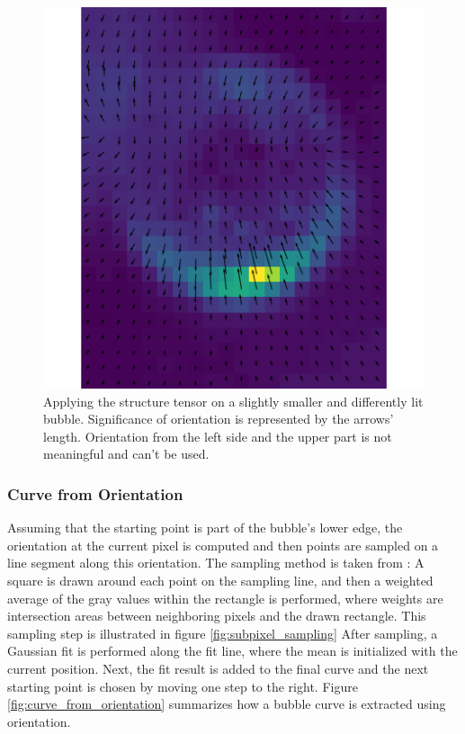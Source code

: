 					
			\begin{figure}
				\includegraphics[scale=0.5]{images/struct_tensor_result_2.png}
				\caption{Applying the structure tensor on a slightly smaller and differently lit bubble. Significance of orientation is represented by the arrows' length. Orientation from the left side and the upper part is not meaningful and can't be used.}
				\label{fig:struct_tensor_result_2}
			\end{figure}
	
	
	
	
	
	
	
			\subsubsection{Curve from Orientation}
				Assuming that the starting point is part of the bubble's lower edge, the orientation at the current pixel is computed and then points are sampled on a line segment along this orientation. The sampling method is taken from \citet{Bopp2018}: A square is drawn around each point on the sampling line, and then a weighted average of the gray values within the rectangle is performed, where weights are intersection areas between neighboring pixels and the drawn rectangle. This sampling step is illustrated in figure \ref{fig:subpixel_sampling}
				 After sampling, a Gaussian fit is performed along the fit line, where the mean is initialized with the current position. Next, the fit result is added to the final curve and the next starting point is chosen by moving one step to the right. 
				 Figure \ref{fig:curve_from_orientation} summarizes how a bubble curve is extracted using orientation. 
				 

